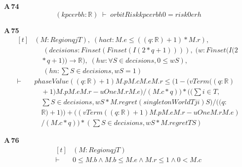 \noindent\textbf{A\,74}\quad{}
{\footnotesize\[ (\mathit{k} \mathit{p} \mathit{c} \mathit{e} \mathit{r} \mathit{b} \mathit{h} : \mathbb{R} ) \;\vdash\; \mathit{orbitRisk} \mathit{k} \mathit{p} \mathit{c} \mathit{e} \mathit{r} \mathit{b} \mathit{h} 0=\mathit{risk0} \mathit{e} \mathit{r} \mathit{h} \]}

\noindent\textbf{A\,75}\quad{}
{\footnotesize\[ \begin{aligned}[t]
&(\mathit{M} : \mathit{Region} \mathit{q} \mathit{j} \mathit{T}),\; (\mathit{hact} : \mathit{M}.\mathit{e} \leq ((\mathit{q}:\mathbb{R} )+1)*\mathit{M}.\mathit{r}),\\
&\quad \; (\mathit{decisions} : \mathit{Finset} (\mathit{Finset} (\mathit{I} (2*\mathit{q}+1)))),\; (\mathit{w} : \mathit{Finset} (\mathit{I} (2\\
&\quad *\mathit{q}+1)) \to \mathbb{R} ),\; (\mathit{hw} : \forall \mathit{S} \in \mathit{decisions},0 \leq \mathit{w} \mathit{S}),\\
&\quad \; (\mathit{hn} : \textstyle\sum \mathit{S} \in \mathit{decisions},\mathit{w} \mathit{S}=1)\\
\vdash\;&\mathit{phaseValue} ((\mathit{q}:\mathbb{R} )+1) \mathit{M}.\mathit{p} \mathit{M}.\mathit{c} \mathit{M}.\mathit{e} \mathit{M}.\mathit{r} \leq (1-(\mathit{vTerm} ((\mathit{q}:\mathbb{R} )\\
&\quad +1) \mathit{M}.\mathit{p} \mathit{M}.\mathit{e} \mathit{M}.\mathit{r}-\mathit{uOne} \mathit{M}.\mathit{r} \mathit{M}.\mathit{e})/(\mathit{M}.\mathit{c}*\mathit{q}))* ((\textstyle\sum \mathit{i} \in \mathit{T},\\
&\quad \textstyle\sum \mathit{S} \in \mathit{decisions},\mathit{w} \mathit{S}*\mathit{M}.\mathit{regret} (\mathit{singletonWorld} \mathit{T} \mathit{j} \mathit{i}) \mathit{S})/((\mathit{q}:\\
&\quad \mathbb{R} )+1))+ ((\mathit{vTerm} ((\mathit{q}:\mathbb{R} )+1) \mathit{M}.\mathit{p} \mathit{M}.\mathit{e} \mathit{M}.\mathit{r}-\mathit{uOne} \mathit{M}.\mathit{r} \mathit{M}.\mathit{e})\\
&\quad /(\mathit{M}.\mathit{c}*\mathit{q}))* (\textstyle\sum \mathit{S} \in \mathit{decisions},\mathit{w} \mathit{S}*\mathit{M}.\mathit{regret} \mathit{T} \mathit{S})
\end{aligned} \]}

\noindent\textbf{A\,76}\quad{}
{\footnotesize\[ \begin{aligned}[t]
&(\mathit{M} : \mathit{Region} \mathit{q} \mathit{j} \mathit{T})\\
\vdash\;&0 \leq \mathit{M}.\mathit{b} \wedge \mathit{M}.\mathit{b} \leq \mathit{M}.\mathit{e} \wedge \mathit{M}.\mathit{r} \leq 1 \wedge 0 < \mathit{M}.\mathit{c}
\end{aligned} \]}

